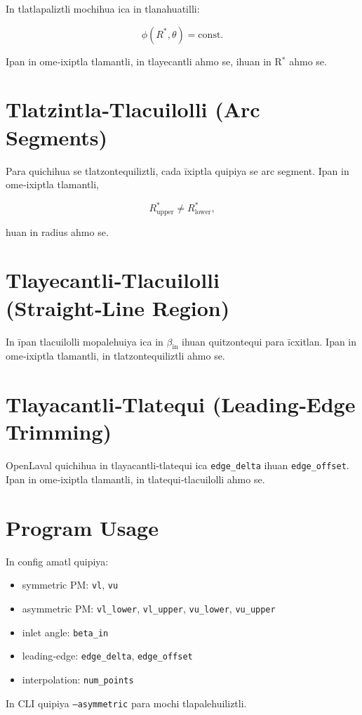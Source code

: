 In tlatlapaliztli mochihua ica in tlanahuatilli:



\[
\phi(R^\ast, \theta) = \mathrm{const.}
\]



Ipan in ome‑ixiptla tlamantli, in tlayecantli
ahmo se, ihuan in R$^\ast$ ahmo se.

\section{Tlatzintla‑Tlacuilolli (Arc Segments)}

Para quichihua se tlatzontequiliztli,
cada īxiptla quipiya se arc segment.
Ipan in ome‑ixiptla tlamantli,


\[
R^\ast_{\mathrm{upper}} \ne R^\ast_{\mathrm{lower}},
\]


huan in radius ahmo se.

\section{Tlayecantli‑Tlacuilolli (Straight‑Line Region)}

In īpan tlacuilolli mopalehuiya ica in
$\beta_{\mathrm{in}}$ ihuan quitzontequi para īcxitlan.
Ipan in ome‑ixiptla tlamantli, in tlatzontequiliztli
ahmo se.

\section{Tlayacantli‑Tlatequi (Leading‑Edge Trimming)}

OpenLaval quichihua in tlayacantli‑tlatequi
ica \texttt{edge\_delta} ihuan \texttt{edge\_offset}.
Ipan in ome‑ixiptla tlamantli, in tlatequi‑tlacuilolli
ahmo se.

\section{Program Usage}

In config amatl quipiya:

\begin{itemize}
  \item symmetric PM: \texttt{vl}, \texttt{vu}
  \item asymmetric PM:
        \texttt{vl\_lower}, \texttt{vl\_upper},
        \texttt{vu\_lower}, \texttt{vu\_upper}
  \item inlet angle: \texttt{beta\_in}
  \item leading‑edge: \texttt{edge\_delta}, \texttt{edge\_offset}
  \item interpolation: \texttt{num\_points}
\end{itemize}

In CLI quipiya \texttt{--asymmetric} para mochi
tlapalehuiliztli.

